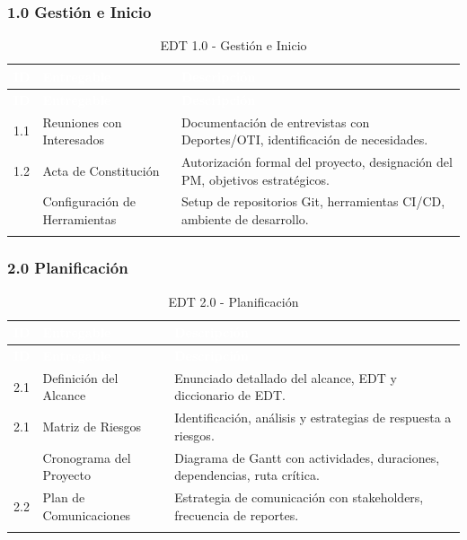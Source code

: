\documentclass[12pt,a4paper]{article}
\begin{document}
\subsubsection{1.0 Gestión e Inicio}

\begin{longtable}{|>{\centering\arraybackslash}p{2.5cm}|>{\raggedright\arraybackslash}p{5cm}|>{\raggedright\arraybackslash}p{7cm}|}
\hline
\rowcolor{headercolor}
\textcolor{white}{\textbf{ID}} & \textcolor{white}{\textbf{Entregable}} & \textcolor{white}{\textbf{Descripción}} \\
\hline
\endfirsthead
\hline
\rowcolor{headercolor}
\textcolor{white}{\textbf{ID}} & \textcolor{white}{\textbf{Entregable}} & \textcolor{white}{\textbf{Descripción}} \\
\hline
\endhead
\hline
\endlastfoot

1.1 & Reuniones con Interesados & Documentación de entrevistas con Deportes/OTI, identificación de necesidades. \\
\hline
\rowcolor{rowgray}
1.2 & Acta de Constitución & Autorización formal del proyecto, designación del PM, objetivos estratégicos. \\
\hline
1.3 & Configuración de Herramientas & Setup de repositorios Git, herramientas CI/CD, ambiente de desarrollo. \\
\hline
\caption{EDT 1.0 - Gestión e Inicio}
\end{longtable}

\subsubsection{2.0 Planificación}

\begin{longtable}{|>{\centering\arraybackslash}p{2.5cm}|>{\raggedright\arraybackslash}p{5cm}|>{\raggedright\arraybackslash}p{7cm}|}
\hline
\rowcolor{headercolor}
\textcolor{white}{\textbf{ID}} & \textcolor{white}{\textbf{Entregable}} & \textcolor{white}{\textbf{Descripción}} \\
\hline
\endfirsthead
\hline
\rowcolor{headercolor}
\textcolor{white}{\textbf{ID}} & \textcolor{white}{\textbf{Entregable}} & \textcolor{white}{\textbf{Descripción}} \\
\hline
\endhead
\hline
\endlastfoot

2.1 & Definición del Alcance & Enunciado detallado del alcance, EDT y diccionario de EDT. \\
\hline
\rowcolor{rowgray}
2.1 & Matriz de Riesgos & Identificación, análisis y estrategias de respuesta a riesgos. \\
\hline
2.2 & Cronograma del Proyecto & Diagrama de Gantt con actividades, duraciones, dependencias, ruta crítica. \\
\hline
\rowcolor{rowgray}
2.2 & Plan de Comunicaciones & Estrategia de comunicación con stakeholders, frecuencia de reportes. \\
\hline
\caption{EDT 2.0 - Planificación}
\end{longtable}
\end{document}
